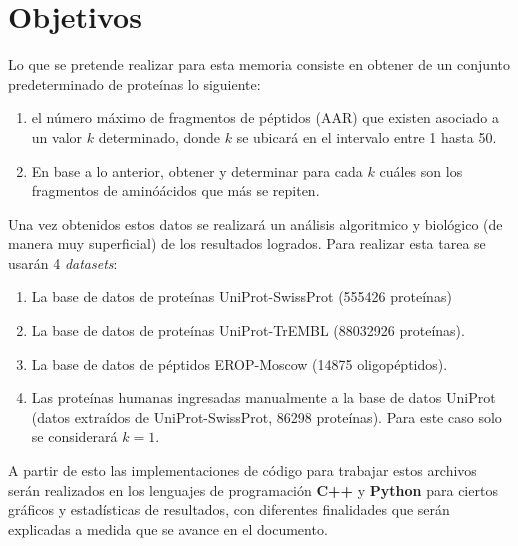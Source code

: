 \section{Objetivos}

Lo que se pretende realizar para esta memoria consiste en obtener de un conjunto predeterminado de proteínas lo siguiente:

\begin{enumerate}

\item el número máximo de fragmentos de péptidos (AAR) que existen asociado a un valor $k$ determinado, donde $k$ se ubicará en el intervalo entre 1 hasta 50.
\item En base a lo anterior, obtener y determinar para cada $k$ cuáles son los fragmentos de aminóácidos que más se repiten.

\end{enumerate}

Una vez obtenidos estos datos se realizará un análisis algoritmico y biológico (de manera muy superficial) de los resultados logrados. Para realizar esta tarea se usarán 4 \textit{datasets}:
 
\begin{enumerate}

\item La base de datos de proteínas UniProt-SwissProt (555426 proteínas)
\item La base de datos de proteínas UniProt-TrEMBL (88032926 proteínas).
\item La base de datos de péptidos EROP-Moscow (14875 oligopéptidos).
\item Las proteínas humanas ingresadas manualmente a la base de datos UniProt (datos extraídos de UniProt-SwissProt, 86298 proteínas). Para este caso solo se considerará $k=1$.

\end{enumerate}

A partir de esto las implementaciones de código para trabajar estos archivos serán realizados en los lenguajes de programación {\textbf{C++}} y {\textbf{Python}} para ciertos gráficos y estadísticas de resultados, con diferentes finalidades que serán explicadas a medida que se avance en el documento.